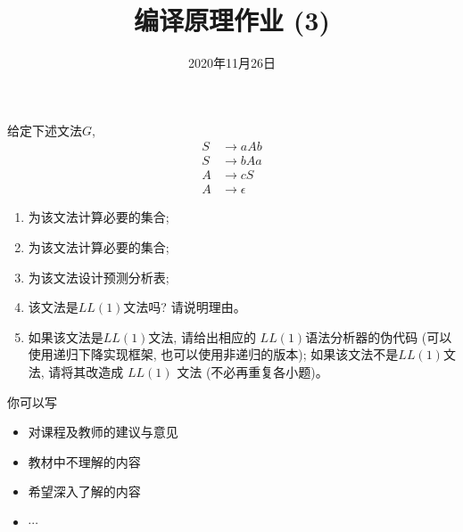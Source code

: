 \documentclass[a4paper, justified]{tufte-handout}
\title{编译原理作业 (3)}
\date{2020年11月26日}
\begin{document}
\maketitle
\noplagiarism %
\begin{abstract}
\end{abstract}
\beginrequired

\begin{problem}[\score{10 = 2 + 2 + 2 + 1 + 3}]
  给定下述文法$G$,
  \begin{align}
    S &\to aAb \\[8pt]
    S &\to bAa \\[8pt]
    A &\to cS \\[8pt]
    A &\to \epsilon
  \end{align}

  \begin{enumerate}[(1)]
    \item 为该文法计算必要的\first{}集合;
    \item 为该文法计算必要的\follow{}集合;
    \item 为该文法设计预测分析表;
    \item 该文法是$LL(1)$文法吗? 请说明理由。
    \item 如果该文法是$LL(1)$文法, 请给出相应的 $LL(1)$语法分析器的伪代码
      (可以使用递归下降实现框架, 也可以使用非递归的版本);
      如果该文法不是$LL(1)$文法, 请将其改造成 $LL(1)$ 文法 (不必再重复各小题)。
  \end{enumerate}
\end{problem}

\begin{solution}
\end{solution}



\beginfb

你可以写
\begin{itemize}
  \item 对课程及教师的建议与意见
  \item 教材中不理解的内容
  \item 希望深入了解的内容
  \item $\cdots$
\end{itemize}
\end{document}
